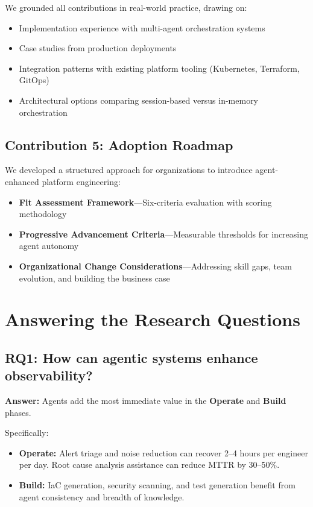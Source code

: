 We grounded all contributions in real-world practice, drawing on:
\begin{itemize}
    \item Implementation experience with multi-agent orchestration systems
    \item Case studies from production deployments
    \item Integration patterns with existing platform tooling (Kubernetes, Terraform, GitOps)
    \item Architectural options comparing session-based versus in-memory orchestration
\end{itemize}

\subsection{Contribution 5: Adoption Roadmap}
\label{subsec:adoption-roadmap}

We developed a structured approach for organizations to introduce agent-enhanced platform engineering:
\begin{itemize}
    \item \textbf{Fit Assessment Framework}---Six-criteria evaluation with scoring methodology
    \item \textbf{Progressive Advancement Criteria}---Measurable thresholds for increasing agent autonomy
    \item \textbf{Organizational Change Considerations}---Addressing skill gaps, team evolution, and building the business case
\end{itemize}

\section{Answering the Research Questions}
\label{sec:answering-rqs}

\subsection{RQ1: How can agentic systems enhance observability?}
\label{subsec:rq1-answer}

\textbf{Answer:} Agents add the most immediate value in the \textbf{Operate} and \textbf{Build} phases.

Specifically:
\begin{itemize}
    \item \textbf{Operate:} Alert triage and noise reduction can recover 2--4 hours per engineer per day. Root cause analysis assistance can reduce MTTR by 30--50\%.
    \item \textbf{Build:} IaC generation, security scanning, and test generation benefit from agent consistency and breadth of knowledge.
\end{itemize}

